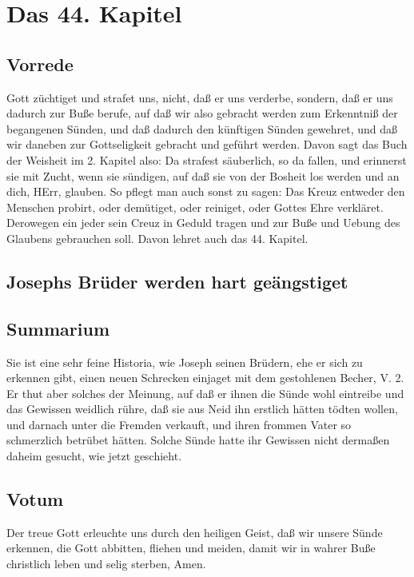 \chapter{Das 44. Kapitel}

\section{Vorrede}

Gott züchtiget und strafet uns, nicht, daß er uns verderbe, sondern, daß er uns dadurch zur Buße berufe, auf daß wir also gebracht werden zum Erkenntniß der begangenen Sünden, und daß dadurch den künftigen Sünden gewehret, und daß wir daneben zur Gottseligkeit gebracht und geführt werden. Davon sagt das Buch der Weisheit im 2. Kapitel also: Da strafest säuberlich, so da fallen, und erinnerst sie mit Zucht, wenn sie sündigen, auf daß sie von der Bosheit los werden und an dich, HErr, glauben. So pflegt man auch sonst zu sagen: Das Kreuz entweder den Menschen probirt, oder demütiget, oder reiniget, oder Gottes Ehre verkläret. Derowegen ein jeder sein Creuz in Geduld tragen und zur Buße und Uebung des Glaubens gebrauchen soll. Davon lehret auch das 44. Kapitel.

\section{Josephs Brüder werden hart geängstiget}

\section{Summarium}

Sie ist eine sehr feine Historia, wie Joseph seinen Brüdern, ehe er sich zu erkennen gibt, einen neuen Schrecken einjaget mit dem gestohlenen Becher, V. 2. Er thut aber solches der Meinung, auf daß er ihnen die Sünde wohl eintreibe und das Gewissen weidlich rühre, daß sie aus Neid ihn erstlich hätten tödten wollen, und darnach unter die Fremden verkauft, und ihren frommen Vater so schmerzlich betrübet hätten. Solche Sünde hatte ihr Gewissen nicht dermaßen daheim gesucht, wie jetzt geschieht.

\section{Votum}

Der treue Gott erleuchte uns durch den heiligen Geist, daß wir unsere Sünde erkennen, die Gott abbitten, fliehen und meiden, damit wir in wahrer Buße christlich leben und selig sterben, Amen.

